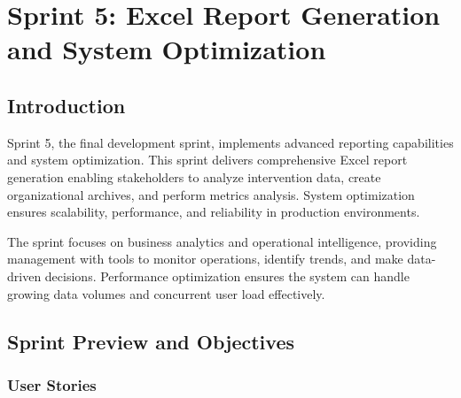 
\chapter{Sprint 5: Excel Report Generation and System Optimization}

\section{Introduction}

Sprint 5, the final development sprint, implements advanced reporting capabilities and system optimization. This sprint delivers comprehensive Excel report generation enabling stakeholders to analyze intervention data, create organizational archives, and perform metrics analysis. System optimization ensures scalability, performance, and reliability in production environments.

The sprint focuses on business analytics and operational intelligence, providing management with tools to monitor operations, identify trends, and make data-driven decisions. Performance optimization ensures the system can handle growing data volumes and concurrent user load effectively.

\section{Sprint Preview and Objectives}

\subsection{User Stories}

